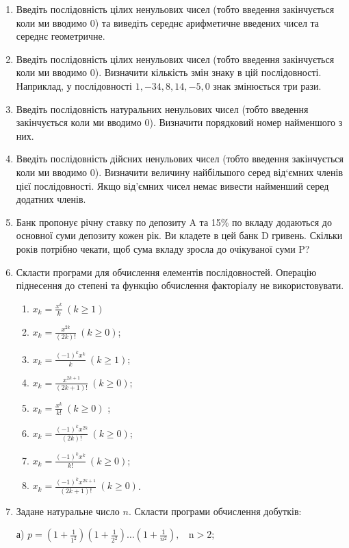 \documentclass[]{article}
\makeatletter
\newcommand{\xslalph}[1]{\expandafter\@xslalph\csname c@#1\endcsname}
\newcommand{\@xslalph}[1]{%
    \ifcase#1\or а\or б\or в\or г\or д\or e\or є\or ж\or з\or i%
    \or й\or к\or л\or м\or н\or о\or п\or р\or с\or т%
    \or у\or ф\or х\or ц\or ч\or ш\or ю\or я\or аа\or бб\or вв %
    \else\@ctrerr\fi%
}
\makeatother
\begin{document}
\begin{enumerate}
\item
Введіть послідовність цілих ненульових чисел (тобто введення
закінчується коли ми вводимо 0) та виведіть середнє арифметичне введених
чисел та середнє геометричне.
\item
Введіть послідовність цілих ненульових чисел (тобто введення
закінчується коли ми вводимо 0). Визначити кількість змін знаку в цій
послідовності. Наприклад, у послідовності $1, -34, 8, 14, -5, 0$ знак
змінюється три рази.
\item
Введіть послідовність натуральних ненульових чисел (тобто введення
закінчується коли ми вводимо 0). Визначити порядковий номер найменшого з
них.
\item
Введіть послідовність дійсних ненульових чисел (тобто введення
закінчується коли ми вводимо 0). Визначити величину найбільшого серед
від`ємних членів цієї послідовності. Якщо від'ємних чисел немає вивести
найменший серед додатних членів.
\item
Банк пропонує річну ставку по депозиту A та 15\% по вкладу додаються до
основної суми депозиту кожен рік. Ви кладете в цей банк D гривень.
Скільки років потрібно чекати, щоб сума вкладу зросла до очікуваної суми
P?
\item
  Скласти програми для обчислення елементів послідовностей. Операцію
  піднесення до степені та функцію обчислення факторіалу не
  використовувати.
\begin{enumerate}[label=\xslalph*)]
\item
\(x_{k} = \frac{x^{k}}{k}\ (k \geq 1)\) 
\item
\(x_{k} = \frac{x^{2k}}{(2k)!}\ (k \geq 0)\);
\item \(x_{k} = \frac{( - 1)^{k}x^{k}}{k}\ (k \geq 1)\); 
\item
\(x_{k} = \frac{x^{2k + 1}}{(2k + 1)!}\ (k \geq 0)\);
\item \(x_{k} = \frac{x^{k}}{k!}\ (k \geq 0)\) ;
\item \(x_{k} = \frac{(-1)^{k}x^{2k}}{(2k)!}\ (k \geq 0)\);
\item \(x_{k} = \frac{(-1)^{k}x^{k}}{k!}\ (k \geq 0)\); 
\item \(x_{k} = \frac{(-1)^{k}x^{2k + 1}}{(2k + 1)!}\ (k \geq  0)\).
 \end{enumerate}

\item
  Задане натуральне число \(n\). Скласти програми обчислення добутків:

а)
\(p = \left( 1 + \frac{1}{1^{2}} \right)\left( 1 + \frac{1}{2^{2}} \right)\ldots\left( 1 + \frac{1}{n^{2}} \right),\mathrm{\ \ \ \ n > 2};\)


\end{enumerate}
\end{document}

